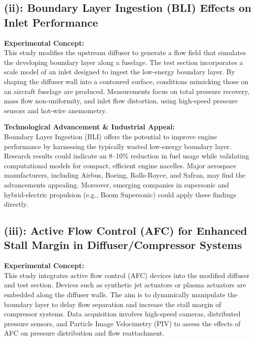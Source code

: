 \documentclass[12pt,a4paper]{article}
\begin{document}
\subsection*{(ii): Boundary Layer Ingestion (BLI) Effects on Inlet Performance}
\textbf{Experimental Concept:}\\[0.5em]
This study modifies the upstream diffuser to generate a flow field that simulates the developing boundary layer along a fuselage. The test section incorporates a scale model of an inlet designed to ingest the low-energy boundary layer. By shaping the diffuser wall into a contoured surface, conditions mimicking those on an aircraft fuselage are produced. Measurements focus on total pressure recovery, mass flow non-uniformity, and inlet flow distortion, using high-speed pressure sensors and hot-wire anemometry.

\vspace{2.5em}
\textbf{Technological Advancement \& Industrial Appeal:}\\[0.5em]
Boundary Layer Ingestion (BLI) offers the potential to improve engine performance by harnessing the typically wasted low-energy boundary layer. Research results could indicate an 8–10\% reduction in fuel usage while validating computational models for compact, efficient engine nacelles. Major aerospace manufacturers, including Airbus, Boeing, Rolls-Royce, and Safran, may find the advancements appealing. Moreover, emerging companies in supersonic and hybrid-electric propulsion (e.g., Boom Supersonic) could apply these findings directly.

\vspace{0.5em}

\subsection*{(iii): Active Flow Control (AFC) for Enhanced Stall Margin in Diffuser/Compressor Systems}
\textbf{Experimental Concept:}\\[0.5em]
This study integrates active flow control (AFC) devices into the modified diffuser and test section. Devices such as synthetic jet actuators or plasma actuators are embedded along the diffuser walls. The aim is to dynamically manipulate the boundary layer to delay flow separation and increase the stall margin of compressor systems. Data acquisition involves high-speed cameras, distributed pressure sensors, and Particle Image Velocimetry (PIV) to assess the effects of AFC on pressure distribution and flow reattachment.
\end{document}
